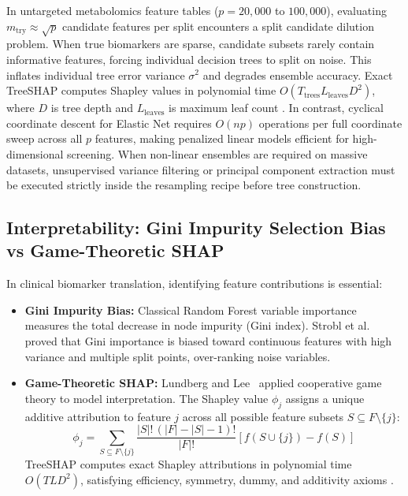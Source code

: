 \documentclass[11pt,oneside]{book}
\begin{document}
In untargeted metabolomics feature tables ($p = 20{,}000$ to $100{,}000$), evaluating $m_{\text{try}} \approx \sqrt{p}$ candidate features per split encounters a split candidate dilution problem. When true biomarkers are sparse, candidate subsets rarely contain informative features, forcing individual decision trees to split on noise. This inflates individual tree error variance $\sigma^2$ and degrades ensemble accuracy. Exact TreeSHAP computes Shapley values in polynomial time $O(T_{\text{trees}} L_{\text{leaves}} D^2)$, where $D$ is tree depth and $L_{\text{leaves}}$ is maximum leaf count \cite{lundberg2020local}. In contrast, cyclical coordinate descent for Elastic Net requires $O(n p)$ operations per full coordinate sweep across all $p$ features, making penalized linear models efficient for high-dimensional screening. When non-linear ensembles are required on massive datasets, unsupervised variance filtering or principal component extraction must be executed strictly inside the resampling recipe before tree construction.

\subsection{Interpretability: Gini Impurity Selection Bias vs Game-Theoretic SHAP}

In clinical biomarker translation, identifying feature contributions is essential:
\begin{itemize}
    \item \textbf{Gini Impurity Bias:} Classical Random Forest variable importance measures the total decrease in node impurity (Gini index). Strobl et al.~\cite{strobl2007bias} proved that Gini importance is biased toward continuous features with high variance and multiple split points, over-ranking noise variables.
    \item \textbf{Game-Theoretic SHAP:} Lundberg and Lee~\cite{lundberg2017unified} applied cooperative game theory to model interpretation. The Shapley value $\phi_j$ assigns a unique additive attribution to feature $j$ across all possible feature subsets $S \subseteq F \setminus \{j\}$:
    \begin{equation}
    \phi_j = \sum_{S \subseteq F \setminus \{j\}} \frac{|S|! \, (|F| - |S| - 1)!}{|F|!} \left[ f(S \cup \{j\}) - f(S) \right]
    \end{equation}
    TreeSHAP computes exact Shapley attributions in polynomial time $O(T L D^2)$, satisfying efficiency, symmetry, dummy, and additivity axioms \cite{lundberg2020local}.
\end{itemize}
\end{document}
